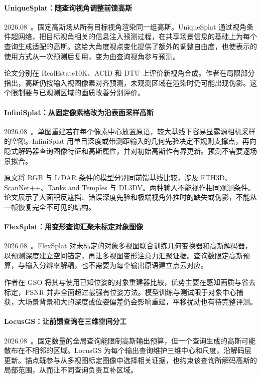 \paragraph{UniqueSplat：随查询视角调整前馈高斯}
2026.08~\cite{2608_02145}。固定高斯场从所有目标视角渲染同一组高斯。UniqueSplat 通过视角条件超网络，把目标视角相关的信息注入预测过程，在共享场景信息的基础上为每个查询生成适配的高斯。这给大角度视点变化提供了额外的调整自由度，也使表示的使用方式从一次预测后复用，变为由查询视角参与预测。

论文分别在 RealEstate10K、ACID 和 DTU 上评价新视角合成。作者在局限部分指出，高斯仍按输入视图像素对齐预测，未观测区域在渲染时仍可能出现伪影。这个限制要与已观测区域的画质改善分别评价。

\paragraph{InfiniSplat：从固定像素格改为沿表面采样高斯}
2026.08~\cite{2608_02437}。单图重建若在每个像素中心放置原语，较大基线下容易显露源相机采样的空隙。InfiniSplat 用单目深度或带测距输入的几何先验决定不规则支撑点，再向隐式解码器查询图像特征和高斯属性，并对初始高斯作有界更新。预测不需要逐场景拟合。

原文将 RGB 与 LiDAR 条件的模型分别同前馈基线比较，涉及 ETH3D、ScanNet++、Tanks and Temples 与 DL3DV。两种输入不能视作相同观测条件。论文展示了大面积反遮挡、错误深度先验和极端视角外推时的缺失或伪影，不能从一帧恢复完全不可见的结构。

\paragraph{FlexSplat：用变形查询汇聚未标定对象图像}
2026.08~\cite{2608_07937}。FlexSplat 对未标定的对象多视图联合训练几何变换器和高斯解码器，以预测深度建立空间锚定，再让多视图变形注意力汇聚证据。查询数限定高斯预算，与输入分辨率解耦，也不需要为每个输出原语建立点云对应。

作者在 GSO 将其与使用已知位姿的对象重建器比较，优势主要在感知画质与省去标定，PSNR 并非全面超过最强有位姿方法。模型训练与测试限于对象中心捕获，大场景背景和大的深度或位姿偏差仍会影响重建，平移扰动也有待完整评测。

\paragraph{LocusGS：让前馈查询在三维空间分工}
2026.08~\cite{2608_12825}。固定数量的全局查询能限制高斯输出预算，但一个查询生成的高斯可能散布在不相邻的区域。LocusGS 为每个输出查询维护三维中心和尺度，沿解码层更新。锚点既参与从多视图标定图像中选择相关证据，也约束该查询所解码高斯的局部范围，从而让不同查询负责互补区域。

